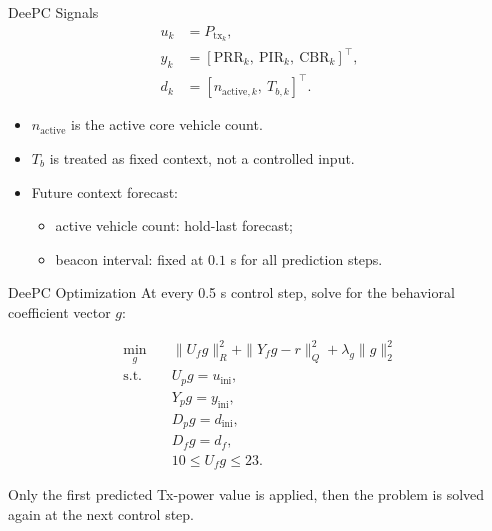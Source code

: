 \documentclass[aspectratio=1610,10pt]{beamer}
\newcommand{\prr}{\mathrm{PRR}}
\newcommand{\pir}{\mathrm{PIR}}
\newcommand{\cbr}{\mathrm{CBR}}
\newcommand{\tx}{P_{\mathrm{tx}}}
\begin{document}
\begin{frame}{DeePC Signals}
  \begin{align*}
    u_k &= \tx_k, \\
    y_k &= [\prr_k,\ \pir_k,\ \cbr_k]^\top, \\
    d_k &= [n_{\mathrm{active},k},\ T_{b,k}]^\top .
  \end{align*}

  \begin{itemize}
    \item $n_{\mathrm{active}}$ is the active core vehicle count.
    \item $T_b$ is treated as fixed context, not a controlled input.
    \item Future context forecast:
      \begin{itemize}
        \item active vehicle count: hold-last forecast;
        \item beacon interval: fixed at $0.1$ s for all prediction steps.
      \end{itemize}
  \end{itemize}
\end{frame}

\begin{frame}{DeePC Optimization}
  At every 0.5 s control step, solve for the behavioral coefficient vector $g$:

  \begin{align*}
    \min_g \quad
    & \|U_f g\|_R^2 + \|Y_f g-r\|_Q^2 + \lambda_g \|g\|_2^2 \\
    \mathrm{s.t.}\quad
    & U_p g = u_{\mathrm{ini}}, \\
    & Y_p g = y_{\mathrm{ini}}, \\
    & D_p g = d_{\mathrm{ini}}, \\
    & D_f g = d_f, \\
    & 10 \leq U_f g \leq 23 .
  \end{align*}

  Only the first predicted Tx-power value is applied, then the problem is solved again at the next control step.
\end{frame}
\end{document}
